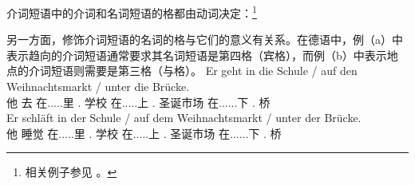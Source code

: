介词短语中的介词和名词短语的格都由动词决定：\footnote{%
相关例子参见  。
}

\eal
{}
\zl
另一方面，修饰介词短语的名词的格与它们的意义有关系。在德语中，例（a）中表示趋向的介词短语通常要求其名词短语是第四格（宾格），而例（b）中表示地点的介词短语则需要是第三格（与格）。
\eal
\ex
\gll Er geht in die Schule / auf den Weihnachtsmarkt / unter die Brücke.\\
	 他 去 在.....里 .\acc{} 学校 {} 在.....上 .\acc{} 圣诞市场 {} 在......下 .\acc{} 桥\\
\ex 
\gll Er schläft in der Schule / auf dem Weihnachtsmarkt / unter der Brücke.\\
	 他 睡觉 在.....里 .\dat{} 学校 {} 在.....上 .\dat{} 圣诞市场 {} 在......下 .\dat{} 桥\\
\zl

